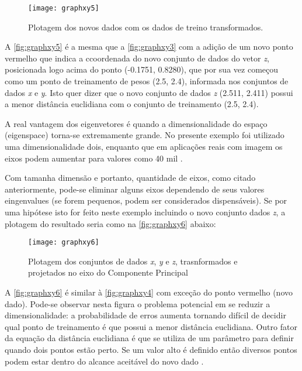 \begin{figure}[h]
	\centering
	\texttt{[image: graphxy5]}
	\caption{Plotagem dos novos dados com os dados de treino transformados.}
	\label{fig:graphxy5}
\end{figure}

A \autoref{fig:graphxy5} é a mesma que a \autoref{fig:graphxy3} com a adição de um novo ponto vermelho que indica a ccoordenada do novo conjunto de dados do vetor \textit{z}, posicionada logo acima do ponto (-0.1751, 0.8280), que por sua vez começou como um ponto de treinamento de pesos (2.5, 2.4), informada nos conjuntos de dados \textit{x} e \textit{y}. Isto quer dizer que o novo conjunto de dados \textit{z} (2.511, 2.411) possui a menor distância euclidiana com o conjunto de treinamento (2.5, 2.4). 

A real vantagem dos eigenvetores é quando a dimensionalidade do espaço (eigenspace) torna-se extremamente grande. No presente exemplo foi utilizado uma dimensionalidade dois, enquanto que em aplicações reais com imagem os eixos podem aumentar para valores como 40 mil \cite{drmathew_java_programming}.

Com tamanha dimensão e portanto, quantidade de eixos, como citado anteriormente, pode-se eliminar alguns eixos dependendo de seus valores eingenvalues (se forem pequenos, podem ser considerados dispensáveis). Se por uma hipótese isto for feito neste exemplo incluindo o novo conjunto dados \textit{z}, a plotagem do resultado seria como na \autoref{fig:graphxy6} abaixo:

\begin{figure}[h]
	\centering
	\texttt{[image: graphxy6]}
	\caption{Plotagem dos conjuntos de dados \textit{x}, \textit{y} e \textit{z}, trasnformados e projetados no eixo do Componente Principal}
	\label{fig:graphxy6}
\end{figure}

A \autoref{fig:graphxy6} é similar à \autoref{fig:graphxy4} com exceção do ponto vermelho (novo dado). Pode-se observar nesta figura o problema potencial em se reduzir a dimensionalidade: a probabilidade de erros aumenta tornando difícil de decidir qual ponto de treinamento é que possui a menor distância euclidiana. Outro fator da equação da distância euclidiana é que se utiliza de um parâmetro para definir quando dois pontos estão perto. Se um valor alto é definido então diversos pontos podem estar dentro do alcance aceitável do novo dado \cite{drmathew_java_programming}.


